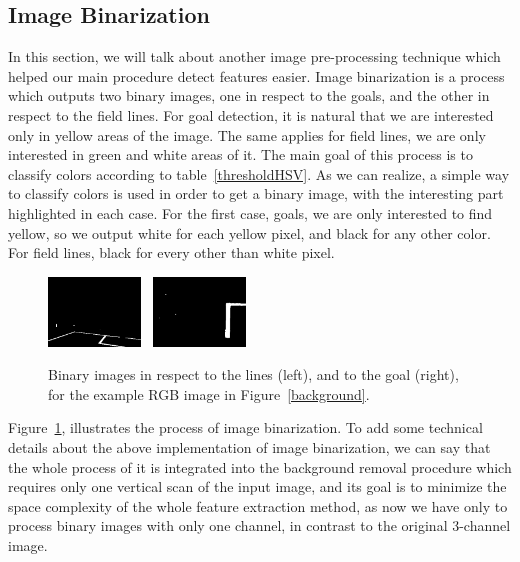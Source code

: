 \documentclass[	DIV=calc,%
							paper=a4,%
							fontsize=9pt,%
							twocolumn]{scrartcl}	 					%
\begin{document}
\subsection{Image Binarization}
\label{sec:ImageBinarization}
In this section, we will talk about another image pre-processing technique which helped our main procedure detect features easier. Image binarization is a process which outputs two binary images, one in respect to the goals, and the other in respect to the field lines. For goal detection, it is natural that we are interested only in yellow areas of the image. The same applies for field lines, we are only interested in green and white areas of it. The main goal of this process is to classify colors according to table~\ref{thresholdHSV}. As we can realize, a simple way to classify colors is used in order to get a binary image, with the interesting part highlighted in each case. For the first case, goals, we are only interested to find yellow, so we output white for each yellow pixel, and black for any other color. For field lines, black for every other than white pixel.

\begin{figure}[h!]
\caption{Binary images in respect to the lines (left),  and to the goal (right), for the example RGB image in Figure~\ref{background}.}
\label{binary}
\centering    
\includegraphics[width=0.22\textwidth]{figures/bin_lines.png} \	
\includegraphics[width=0.22\textwidth]{figures/bin_posts.png} \	
\end{figure}

Figure~\ref{binary}, illustrates the process of image binarization. To add some technical details about the above implementation of image binarization, we can say that the whole process of it is integrated into the background removal procedure which requires only one vertical scan of the input image, and its goal is to minimize the space complexity of the whole feature extraction method, as now we have only to process binary images with only one channel, in contrast to the original 3-channel image.
\end{document}

